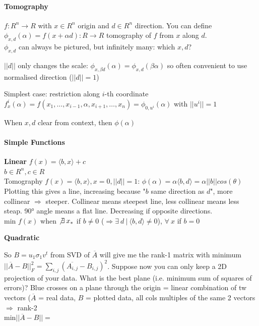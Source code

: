 \documentclass[10pt]{report}
\begin{document}
\paragraph{Tomography} $f:R^n \rightarrow R$ with $x\in R^n$ origin and $d\in R^n$ direction. You can define $\phi_{x,d}(\alpha) = f(x + \alpha d): R \rightarrow R$ tomography of $f$ from $x$ along $d$.\\
$\phi_{x,d}$ can always be pictured, but infinitely many: which $x,d$?\begin{list}{}{}
	\item $||d||$ only changes the scale: $\phi_{x,\beta d}(\alpha) = \phi_{x,d}(\beta \alpha)$ so often convenient to use normalised direction ($||d|| = 1$)
	\item Simplest case: restriction along $i$-th coordinate\\
	$f_x^i(\alpha) = f(x_1,\ldots,x_{i-1},\alpha,x_{i+1},\ldots,x_n) = \phi_{0,u^i}(\alpha)$ with $||u^i|| = 1$
	\item When $x,d$ clear from context, then $\phi(\alpha)$
\end{list}
\paragraph{Simple Functions} \begin{list}{}{}
	\item \textbf{Linear} $f(x) = \langle b,x\rangle + c$\\
	$b \in R^n, c\in R$\\
	Tomography $f(x) = \langle b,x\rangle, x = 0, ||d||=1$: $\phi(\alpha) = \alpha\langle b, d\rangle = \alpha||b||cos(\theta)$\\
	Plotting this gives a line, increasing because "$b$ same direction as $d$", more collinear $\Rightarrow$ steeper. Collinear means steepest line, less collinear means less steap. 90° angle means a flat line. Decreasing if opposite directions.\\
	min $f(x)$ when $\not\exists\:x_*$ if $b \neq 0$ ($\Rightarrow \exists\: d\:|\:\langle b,d\rangle \neq 0$), $\forall\:x$ if $b = 0$
	\item \textbf{Quadratic} %
\end{list}
So $B=u_1\sigma_1 v^t$ from SVD of $\overline{A}$ will give me the rank-1 matrix with minimum $||\overline{A}-B||_F^2 = \sum_{i,j}(\overline{A_{i,j}} - B_{i,j})^2$. Suppose now you can only keep a 2D projection of your data. What is the best plane (i.e. minimum sum of squares of errors)? Blue crosses on a plane through the origin = linear combination of tw vectors ($\overline{A}$ = real data, $B$ = plotted data, all cols multiples of the same 2 vectors $\Rightarrow$ rank-2\\
min$||\overline{A}-B|| = $
\end{document}
